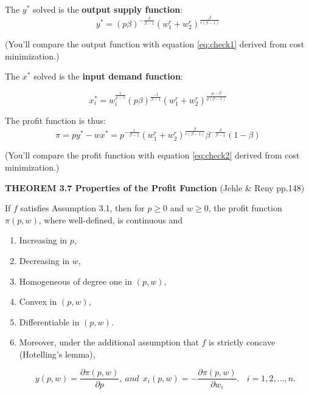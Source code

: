 \documentclass{article}
\begin{document}
\begin{mdframed}[backgroundcolor=blue!20,linecolor=white]
The $y^*$ solved is the \textbf{output supply function}:
\begin{equation}
y^* = (p\beta)^{-\frac{\beta}{\beta - 1}}(w_1^r + w_2^r)^{\frac{\beta}{r(\beta - 1)}}
    \label{eq:E5}   
\end{equation}

(You'll compare the output function with equation \ref{eq:check1} derived from cost minimization.)

The $x^*$ solved is the \textbf{input demand function}:

\begin{equation}
x_i^* = w_i^{\frac{1}{\rho -1}}  (p\beta)^{\frac{-1}{\beta - 1}}(w_1^r + w_2^r)^{\frac{\rho -\beta}{\rho(\beta -1)}}
    \label{eq:E6}   
\end{equation}



The profit function is thus:
\begin{equation}
\pi = py^* - wx^* = p^{-\frac{1}{\beta - 1}} (w_1^r + w_2^r)^{\frac{\beta}{r(\beta - 1)}}\beta^{-\frac{\beta}{\beta - 1}}(1-\beta)
    \label{eq:E7}   
\end{equation}

(You'll compare the profit function with equation \ref{eq:check2} derived from cost minimization.)

\textbf{THEOREM 3.7 Properties of the Profit Function} (Jehle \& Reny pp.148)

If $f$ satisfies Assumption 3.1, then for $p \ge 0$ and $w \ge 0$, the profit function $\pi (p,w)$, where well-defined, is continuous and

\begin{enumerate}

\item Increasing in $p$,
\item Decreasing in $w$,
\item Homogeneous of degree one in $(p,w)$,
\item Convex in $(p,w)$,
\item Differentiable in $(p,w)$.
\item Moreover, under the additional assumption that $f$ is strictly concave \\ (Hotelling's lemma),

$$y(p,w) = \frac{\partial \pi(p,w)}{\partial p},\ and \ \ x_i(p,w) = - \frac{\partial \pi(p,w)}{\partial w_i}. \ \ \ \ i = 1,2, \dots , n.$$
\end{enumerate}
\end{mdframed}
\end{document}
